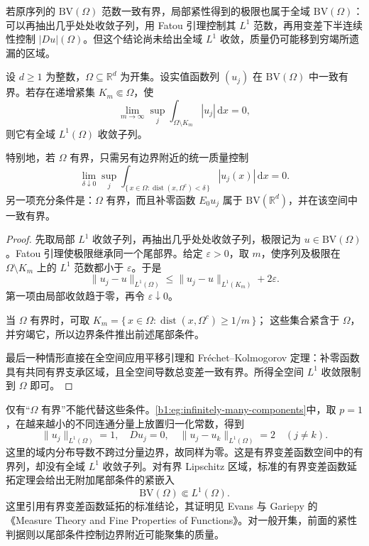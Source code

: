 若原序列的 \(\mathrm{BV}(\Omega)\) 范数一致有界，局部紧性得到的极限也属于全域
\(\mathrm{BV}(\Omega)\)：可以再抽出几乎处处收敛子列，用 Fatou 引理控制其
\(L^1\) 范数，再用变差下半连续性控制 \(|Du|(\Omega)\)。但这个结论尚未给出全域 \(L^1\) 收敛，质量仍可能移到穷竭所遗漏的区域。

\begin{corollary}\label{b1:cor:bv-global-compactness-with-tails}
设 \(d\ge1\) 为整数，\(\Omega\subseteq\mathbb R^d\) 为开集。设实值函数列 \((u_j)\) 在 \(\mathrm{BV}(\Omega)\) 中一致有界。若存在递增紧集
\(K_m\Subset\Omega\)，使
\[
 \lim_{m\to\infty}\sup_j
       \int_{\Omega\setminus K_m}|u_j|\,\mathrm dx=0,
\]
则它有全域 \(L^1(\Omega)\) 收敛子列。

\ProseParagraphBreak

特别地，若 \(\Omega\) 有界，只需另有边界附近的统一质量控制
\[
 \lim_{\delta\downarrow0}\sup_j
 \int_{\{\,x\in\Omega:\operatorname{dist}(x,\Omega^c)<\delta\,\}}
       |u_j(x)|\,\mathrm dx=0.
\]
另一项充分条件是：\(\Omega\) 有界，而且补零函数 \(E_0u_j\) 属于
\(\mathrm{BV}(\mathbb R^d)\)，并在该空间中一致有界。
\end{corollary}
\begin{proof}
先取局部 \(L^1\) 收敛子列，再抽出几乎处处收敛子列，极限记为
\(u\in \mathrm{BV}(\Omega)\)。Fatou 引理使极限继承同一个尾部界。给定
\(\varepsilon>0\)，取 \(m\)，使序列及极限在 \(\Omega\setminus K_m\) 上的 \(L^1\) 范数都小于 \(\varepsilon\)。于是
\[
 \|u_j-u\|_{L^1(\Omega)}
 \leq\|u_j-u\|_{L^1(K_m)}+2\varepsilon.
\]
第一项由局部收敛趋于零，再令 \(\varepsilon\downarrow0\)。

当 \(\Omega\) 有界时，可取
\(K_m=\{\,x\in\Omega:\operatorname{dist}(x,\Omega^c)\geq1/m\,\}\)；
这些集合紧含于 \(\Omega\)，并穷竭它，所以边界条件推出前述尾部条件。

最后一种情形直接在全空间应用平移引理和 Fréchet--Kolmogorov 定理：补零函数具有共同有界支承区域，且全空间导数总变差一致有界。所得全空间 \(L^1\) 收敛限制到 \(\Omega\) 即可。
\end{proof}

仅有“\(\Omega\) 有界”不能代替这些条件。\cref{b1:eg:infinitely-many-components}中，取 \(p=1\)，在越来越小的不同连通分量上放置归一化常数，得到
\[
 \|u_j\|_{L^1(\Omega)}=1,\quad Du_j=0,\quad
 \|u_j-u_k\|_{L^1(\Omega)}=2\quad(j\ne k).
\]
这里的域内分布导数不跨过分量边界，故同样为零。这是有界变差函数空间中的有界列，却没有全域 \(L^1\) 收敛子列。对有界 Lipschitz 区域，标准的有界变差函数延拓定理会给出无附加尾部条件的紧嵌入
\[
 \mathrm{BV}(\Omega)\Subset L^1(\Omega).
\]
这里引用有界变差函数延拓的标准结论，其证明见 Evans 与 Gariepy 的《Measure Theory and Fine Properties of Functions》\cite{Evans2015Measure}。对一般开集，前面的紧性判据则以尾部条件控制边界附近可能聚集的质量。

